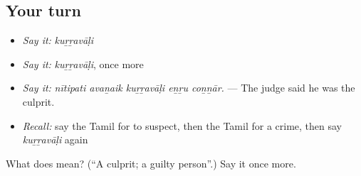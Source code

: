 \subsection*{Your turn}
\begin{itemize}
\raggedright
  \item \emph{Say it:} \emph{kuṟṟavāḷi}
  \item \emph{Say it:} \emph{kuṟṟavāḷi}, once more
  \item \emph{Say it:} \emph{nītipati avaṉaik kuṟṟavāḷi eṉṟu coṉṉār.} — The judge said he was the culprit.
  \item \emph{Recall:} say the Tamil for to suspect, then the Tamil for a crime, then say \emph{kuṟṟavāḷi} again
\end{itemize}

\begin{tcolorbox}[breakable,colback=teal!4,colframe=teal!35!black,title={Before you move on}]
What does  mean? (\textquotedblleft{}A culprit; a guilty person\textquotedblright{}.) Say it once more.
\end{tcolorbox}
